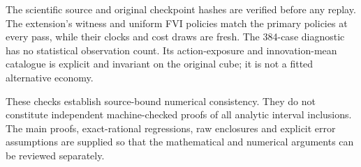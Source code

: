 The scientific source and original checkpoint hashes are verified before any replay. The extension's witness and uniform FVI policies match the primary policies at every pass, while their clocks and cost draws are fresh. The 384-case diagnostic has no statistical observation count. Its action-exposure and innovation-mean catalogue is explicit and invariant on the original cube; it is not a fitted alternative economy.

These checks establish source-bound numerical consistency. They do not constitute independent machine-checked proofs of all analytic interval inclusions. The main proofs, exact-rational regressions, raw enclosures and explicit error assumptions are supplied so that the mathematical and numerical arguments can be reviewed separately.
